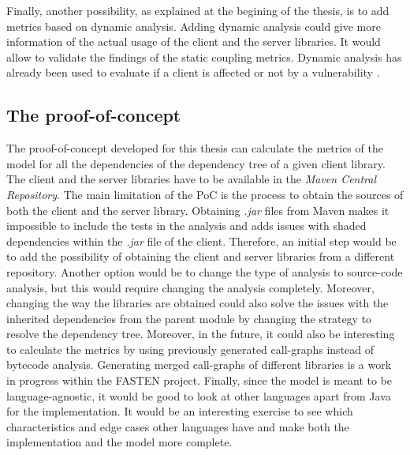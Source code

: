 Finally, another possibility, as explained at the begining of the thesis, is to add metrics based on dynamic analysis. Adding dynamic analysis could give more information of the actual usage of the client and the server libraries. It would allow to validate the findings of the static coupling metrics. Dynamic analysis has already been used to evaluate if a client is affected or not by a vulnerability \cite{plate2015impact}.

\subsection{The proof-of-concept}

The proof-of-concept developed for this thesis can calculate the metrics of the model for all the dependencies of the dependency tree of a given client library. The client and the server libraries have to be available in the \textit{Maven Central Repository}. The main limitation of the PoC is the process to obtain the sources of both the client and the server library. Obtaining \textit{.jar} files from Maven makes it impossible to include the tests in the analysis and adds issues with shaded dependencies within the \textit{.jar} file of the client. Therefore, an initial step would be to add the possibility of obtaining the client and server libraries from a different repository. Another option would be to change the type of analysis to source-code analysis, but this would require changing the analysis completely. Moreover, changing the way the libraries are obtained could also solve the issues with the inherited dependencies from the parent module by changing the strategy to resolve the dependency tree.
Moreover, in the future, it could also be interesting to calculate the metrics by using previously generated call-graphs instead of bytecode analysis. Generating merged call-graphs of different libraries is a work in progress within the FASTEN project. Finally, since the model is meant to be language-agnostic, it would be good to look at other languages apart from Java for the implementation. It would be an interesting exercise to see which characteristics and edge cases other languages have and make both the implementation and the model more complete.
